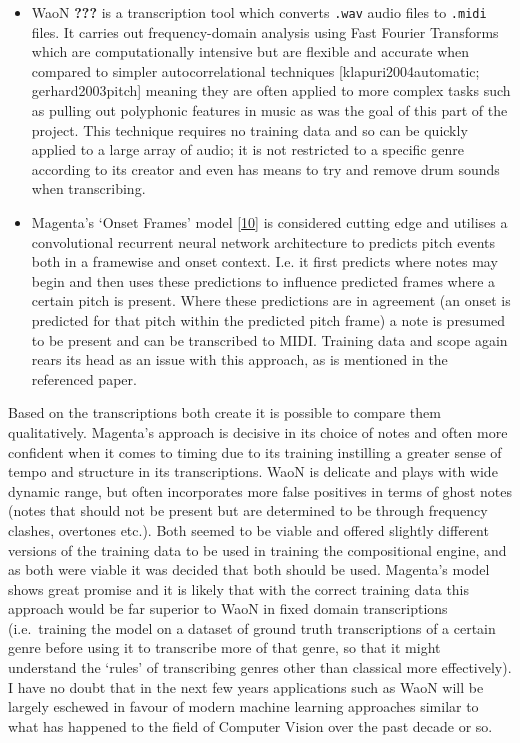 \documentclass[12pt,]{article}
\providecommand{\tightlist}{%
  \setlength{\itemsep}{0pt}\setlength{\parskip}{0pt}}
\begin{document}
\begin{itemize}
\tightlist
\item
  WaoN {\textbf{???}} is a transcription tool which converts
  \texttt{.wav} audio files to \texttt{.midi} files. It carries out
  frequency-domain analysis using Fast Fourier Transforms which are
  computationally intensive but are flexible and accurate when compared
  to simpler autocorrelational techniques {[}klapuri2004automatic;
  gerhard2003pitch{]} meaning they are often applied to more complex
  tasks such as pulling out polyphonic features in music as was the goal
  of this part of the project. This technique requires no training data
  and so can be quickly applied to a large array of audio; it is not
  restricted to a specific genre according to its creator and even has
  means to try and remove drum sounds when transcribing.
\item
  Magenta's `Onset Frames' model
  {[}\protect\hyperlink{ref-magentaonsetframes}{10}{]} is considered
  cutting edge and utilises a convolutional recurrent neural network
  architecture to predicts pitch events both in a framewise and onset
  context. I.e. it first predicts where notes may begin and then uses
  these predictions to influence predicted frames where a certain pitch
  is present. Where these predictions are in agreement (an onset is
  predicted for that pitch within the predicted pitch frame) a note is
  presumed to be present and can be transcribed to MIDI. Training data
  and scope again rears its head as an issue with this approach, as is
  mentioned in the referenced paper.
\end{itemize}

Based on the transcriptions both create it is possible to compare them
qualitatively. Magenta's approach is decisive in its choice of notes and
often more confident when it comes to timing due to its training
instilling a greater sense of tempo and structure in its transcriptions.
WaoN is delicate and plays with wide dynamic range, but often
incorporates more false positives in terms of ghost notes (notes that
should not be present but are determined to be through frequency
clashes, overtones etc.). Both seemed to be viable and offered slightly
different versions of the training data to be used in training the
compositional engine, and as both were viable it was decided that both
should be used. Magenta's model shows great promise and it is likely
that with the correct training data this approach would be far superior
to WaoN in fixed domain transcriptions (i.e.~training the model on a
dataset of ground truth transcriptions of a certain genre before using
it to transcribe more of that genre, so that it might understand the
`rules' of transcribing genres other than classical more effectively). I
have no doubt that in the next few years applications such as WaoN will
be largely eschewed in favour of modern machine learning approaches
similar to what has happened to the field of Computer Vision over the
past decade or so.
\end{document}
